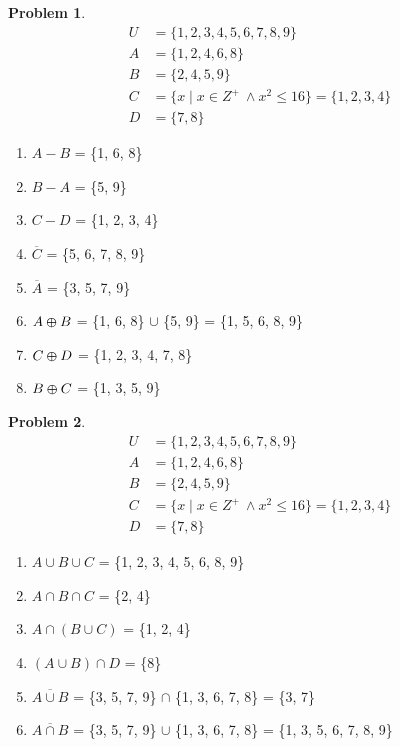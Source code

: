 \documentclass{article}
\theoremstyle{definition}
\newtheorem{problem}{Problem}[section]
\begin{document}
\begin{problem}
\[
    \begin{aligned}
        U &= \{1, 2, 3, 4, 5, 6, 7, 8, 9\}\\
        A &= \{1, 2, 4, 6, 8\}\\
        B &= \{2, 4, 5, 9\}\\
        C &= \{x \mid x \in Z^+\ \land x^2 \leq 16\}=\{1, 2, 3, 4\}\\
        D &= \{7, 8\}
    \end{aligned}
\]
    \begin{enumerate}[label=(\alph*)]
        Compute

        \item \(A - B\) = \{1, 6, 8\}
        \item \(B - A\) = \{5, 9\}
        \item \(C - D\) = \{1, 2, 3, 4\}
        \item \(\overline{C}\) = \{5, 6, 7, 8, 9\}
        \item \(\overline{A}\) = \{3, 5, 7, 9\}
        \item \(A \varoplus B\) = \{1, 6, 8\} $\cup$ \{5, 9\} = \{1, 5, 6, 8, 9\}
        \item \(C \varoplus D\) = \{1, 2, 3, 4, 7, 8\}
        \item \(B \varoplus C\) = \{1, 3, 5, 9\}
    \end{enumerate}
\end{problem}


\begin{problem}
\[
    \begin{aligned}
        U &= \{1, 2, 3, 4, 5, 6, 7, 8, 9\}\\
        A &= \{1, 2, 4, 6, 8\}\\
        B &= \{2, 4, 5, 9\}\\
        C &= \{x \mid x \in Z^+\ \land x^2 \leq 16\}=\{1, 2, 3, 4\}\\
        D &= \{7, 8\}
    \end{aligned}
\]
    \begin{enumerate}[label=(\alph*)]
        Compute

        \item \(A \cup B \cup C\) = \{1, 2, 3, 4, 5, 6, 8, 9\}
        \item \(A \cap B \cap C\) = \{2, 4\}
        \item \(A \cap (B \cup C)\) = \{1, 2, 4\}
        \item \((A \cup B) \cap D\) = \{8\}
        \item \(\overline{A \cup B}\) = \{3, 5, 7, 9\} $\cap$ \{1, 3, 6, 7, 8\} = \{3, 7\}
        \item \(\overline{A \cap B}\) = \{3, 5, 7, 9\} $\cup$ \{1, 3, 6, 7, 8\} = \{1, 3, 5, 6, 7, 8, 9\}
    \end{enumerate}
\end{problem}
\end{document}
